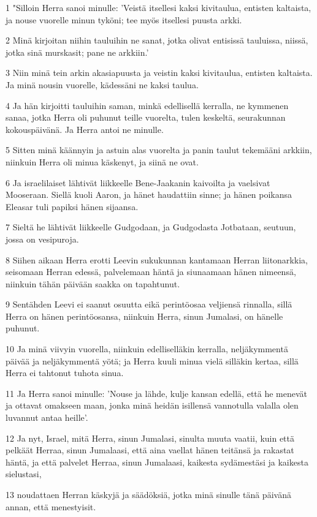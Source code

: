 \par 1 "Silloin Herra sanoi minulle: 'Veistä itsellesi kaksi kivitaulua, entisten kaltaista, ja nouse vuorelle minun tyköni; tee myös itsellesi puusta arkki.
\par 2 Minä kirjoitan niihin tauluihin ne sanat, jotka olivat entisissä tauluissa, niissä, jotka sinä murskasit; pane ne arkkiin.'
\par 3 Niin minä tein arkin akasiapuusta ja veistin kaksi kivitaulua, entisten kaltaista. Ja minä nousin vuorelle, kädessäni ne kaksi taulua.
\par 4 Ja hän kirjoitti tauluihin saman, minkä edellisellä kerralla, ne kymmenen sanaa, jotka Herra oli puhunut teille vuorelta, tulen keskeltä, seurakunnan kokouspäivänä. Ja Herra antoi ne minulle.
\par 5 Sitten minä käännyin ja astuin alas vuorelta ja panin taulut tekemääni arkkiin, niinkuin Herra oli minua käskenyt, ja siinä ne ovat.
\par 6 Ja israelilaiset lähtivät liikkeelle Bene-Jaakanin kaivoilta ja vaelsivat Mooseraan. Siellä kuoli Aaron, ja hänet haudattiin sinne; ja hänen poikansa Eleasar tuli papiksi hänen sijaansa.
\par 7 Sieltä he lähtivät liikkeelle Gudgodaan, ja Gudgodasta Jotbataan, seutuun, jossa on vesipuroja.
\par 8 Siihen aikaan Herra erotti Leevin sukukunnan kantamaan Herran liitonarkkia, seisomaan Herran edessä, palvelemaan häntä ja siunaamaan hänen nimeensä, niinkuin tähän päivään saakka on tapahtunut.
\par 9 Sentähden Leevi ei saanut osuutta eikä perintöosaa veljiensä rinnalla, sillä Herra on hänen perintöosansa, niinkuin Herra, sinun Jumalasi, on hänelle puhunut.
\par 10 Ja minä viivyin vuorella, niinkuin edelliselläkin kerralla, neljäkymmentä päivää ja neljäkymmentä yötä; ja Herra kuuli minua vielä silläkin kertaa, sillä Herra ei tahtonut tuhota sinua.
\par 11 Ja Herra sanoi minulle: 'Nouse ja lähde, kulje kansan edellä, että he menevät ja ottavat omakseen maan, jonka minä heidän isillensä vannotulla valalla olen luvannut antaa heille'.
\par 12 Ja nyt, Israel, mitä Herra, sinun Jumalasi, sinulta muuta vaatii, kuin että pelkäät Herraa, sinun Jumalaasi, että aina vaellat hänen teitänsä ja rakastat häntä, ja että palvelet Herraa, sinun Jumalaasi, kaikesta sydämestäsi ja kaikesta sielustasi,
\par 13 noudattaen Herran käskyjä ja säädöksiä, jotka minä sinulle tänä päivänä annan, että menestyisit.
